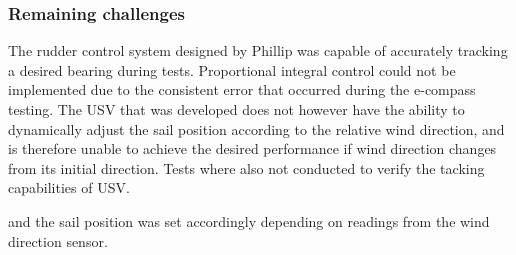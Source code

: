  \subsubsection{Remaining challenges}
 The rudder control system designed by Phillip was capable of accurately tracking a desired bearing during tests. Proportional integral control could not be implemented due to the consistent error that occurred during 
 the e-compass testing. The USV that was developed does not however have the ability to dynamically adjust the sail position according to the relative wind direction, and is therefore unable to achieve the desired 
 performance if wind direction changes from its initial direction. Tests where also not conducted to verify the tacking capabilities of USV.




and the sail position was set accordingly depending on readings from the wind direction sensor.


